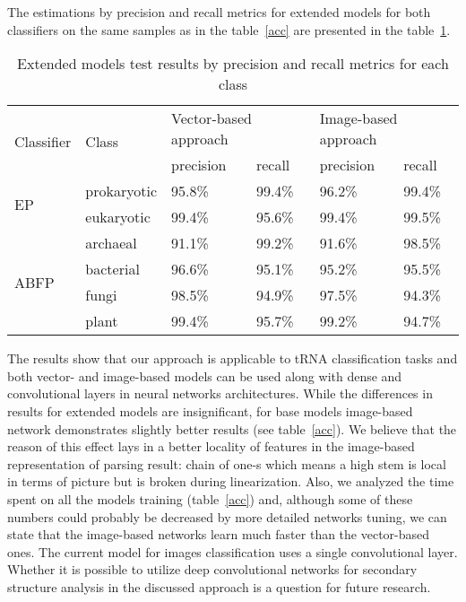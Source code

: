 The estimations by precision and recall metrics for extended models for both classifiers on the same samples as in the  table~\ref{acc} are presented in the table~\ref{pe}.

\begin{table}[h]
\centering
\caption{Extended models test results by precision and recall metrics for each class}
\begin{tabular}{|l||l|l|l|l|l|}
\hline
\multirow{2}{*}{Classifier} & \multirow{2}{*}{Class} & \multicolumn{2}{l|}{Vector-based approach} & \multicolumn{2}{l|}{Image-based approach} \\ \cline{3-6} 
                            &                        & precision         & recall        & precision        & recall        \\ \hline \hline
\multirow{2}{*}{EP}         & prokaryotic            & 95.8\%            & 99.4\%        & 96.2\%           & 99.4\%        \\ \cline{2-6} 
                            & eukaryotic             & 99.4\%            & 95.6\%        & 99.4\%           & 99.5\%        \\ \hline \hline
\multirow{4}{*}{ABFP}       & archaeal               & 91.1\%            & 99.2\%        & 91.6\%           & 98.5\%        \\ \cline{2-6} 
                            & bacterial              & 96.6\%            & 95.1\%        & 95.2\%           & 95.5\%        \\ \cline{2-6} 
                            & fungi                  & 98.5\%            & 94.9\%        & 97.5\%           & 94.3\%        \\ \cline{2-6} 
                            & plant                  & 99.4\%            & 95.7\%        & 99.2\%           & 94.7\%        \\ \hline
\end{tabular}
\label{pe}
\end{table}

The results show that our approach is applicable to tRNA classification tasks and both vector- and image-based models can be used along with dense and convolutional layers in neural networks architectures.
While the differences in results for extended models are insignificant, for base models image-based network demonstrates slightly better results (see table~\ref{acc}).
We believe that the reason of this effect lays in a better locality of features in the image-based representation of parsing result: chain of one-s which means a high stem is local in terms of picture but is broken during linearization. 
Also, we analyzed the time spent on all the models training (table~\ref{acc}) and, although some of these numbers could probably be decreased by more detailed networks tuning, we can state that the image-based networks learn much faster than the vector-based ones.
The current model for images classification uses a single convolutional layer.
Whether it is possible to utilize deep convolutional networks for secondary structure analysis in the discussed approach is a question for future research.

